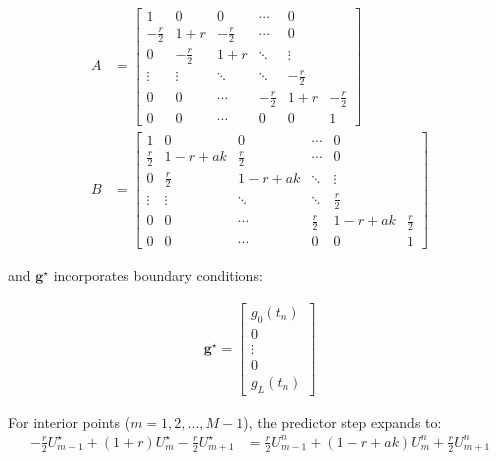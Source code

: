 \begin{align}
  A & =
  \begin{bmatrix}
    1            & 0            & 0            & \cdots       & 0                           \\
    -\frac{r}{2} & 1+r          & -\frac{r}{2} & \cdots       & 0                           \\
    0            & -\frac{r}{2} & 1+r          & \ddots       & \vdots                      \\
    \vdots       & \vdots       & \ddots       & \ddots       & -\frac{r}{2}                \\
    0            & 0            & \cdots       & -\frac{r}{2} & 1+r          & -\frac{r}{2} \\
    0            & 0            & \cdots       & 0            & 0            & 1
  \end{bmatrix} \\
  B & =
  \begin{bmatrix}
    1           & 0           & 0           & \cdots      & 0                         \\
    \frac{r}{2} & 1-r+ak      & \frac{r}{2} & \cdots      & 0                         \\
    0           & \frac{r}{2} & 1-r+ak      & \ddots      & \vdots                    \\
    \vdots      & \vdots      & \ddots      & \ddots      & \frac{r}{2}               \\
    0           & 0           & \cdots      & \frac{r}{2} & 1-r+ak      & \frac{r}{2} \\
    0           & 0           & \cdots      & 0           & 0           & 1
  \end{bmatrix}
\end{align}

and $\mathbf{g}^\star$ incorporates boundary conditions:

\begin{align}
  \mathbf{g}^\star =
  \begin{bmatrix}
    g_0(t_n) \\
    0        \\
    \vdots   \\
    0        \\
    g_L(t_n)
  \end{bmatrix}
\end{align}

For interior points ($m = 1, 2, ..., M-1$), the predictor step expands to:
\begin{align}
  -\frac{r}{2}U_{m-1}^\star + (1+r)U_m^\star - \frac{r}{2}U_{m+1}^\star & = \frac{r}{2}U_{m-1}^n + (1-r+ak)U_m^n + \frac{r}{2}U_{m+1}^n
\end{align}

